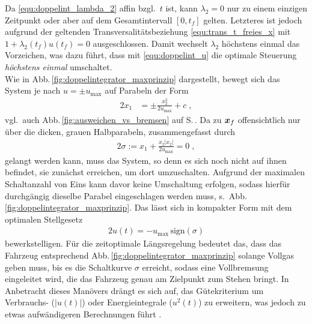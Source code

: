 Da \eqref{equ:doppelint_lambda_2} affin bzgl.\ $t$ ist, kann $\lambda_2 = 0$ nur zu einem einzigen Zeitpunkt oder aber auf dem Gesamtintervall $[0, t_f]$ gelten. Letzteres ist jedoch aufgrund der geltenden Transversalitätsbeziehung \eqref{equ:trans_t_freies_x} mit $1+\lambda_2(t_f) u(t_f) = 0$ ausgeschlossen. Damit wechselt $\lambda_2$ höchstens einmal das Vorzeichen, was dazu führt, dass mit \eqref{equ:doppelint_u} die optimale Steuerung \emph{höchstens einmal} umschaltet. \\
Wie in Abb.\,\ref{fig:doppelintegrator_maxprinzip} dargestellt, bewegt sich das System je nach $u = \pm u_{\max}$ auf Parabeln der Form
\begin{alignat*}{2}
	x_1 &= \pm \frac{x_2^2}{2 u_{\max}} + c \;,
\end{alignat*}
vgl.\ auch Abb.\,\ref{fig:ausweichen_vs_bremsen} auf S.\,\pageref{fig:ausweichen_vs_bremsen}. Da zu $\boldsymbol{x}_f$ offensichtlich nur über die dicken, grauen Halbparabeln, zusammengefasst durch
\begin{alignat*}{2}
	\sigma := x_1 + \frac{x_2|x_2|}{2 u_{\max}} = 0\; ,
\end{alignat*}
gelangt werden kann, muss das System, so denn es sich noch nicht auf ihnen befindet, sie zunächst erreichen, um dort umzuschalten. Aufgrund der maximalen Schaltanzahl von Eins kann davor keine Umschaltung erfolgen, sodass hierfür durchgängig dieselbe Parabel eingeschlagen werden muss, s.\ Abb.\,\ref{fig:doppelintegrator_maxprinzip}. Das lässt sich in kompakter Form mit dem optimalen Stellgesetz 
\begin{alignat*}{2}
	u(t) = - u_{\text{max}}\,\text{sign}\left(\sigma\right)
\end{alignat*}
bewerkstelligen. Für die zeitoptimale Längsregelung bedeutet das, dass das Fahrzeug entsprechend Abb.\,\ref{fig:doppelintegrator_maxprinzip} solange Vollgas geben muss, bis es die Schaltkurve $\sigma$ erreicht, sodass eine Vollbremsung eingeleitet wird, die das Fahrzeug genau am Zielpunkt zum Stehen bringt. In Anbetracht dieses Manövers drängt es sich auf, das Gütekriterium um Verbrauchs- ($|u(t)|$) oder Energieintegrale  ($u^2(t)$) zu erweitern, was jedoch zu etwas aufwändigeren Berechnungen führt \cite{papageorgiou2012optimierung}.


